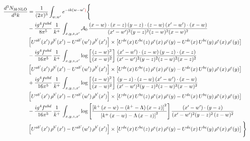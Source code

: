 \documentclass[9pt]{article}
\numberwithin{equation}{section}
\begin{document}
\begin{align}
\frac{d^{3}N_{3b\,\rm NLO}}{d^{3}k} & = \frac{1}{(2\pi)^{3}}\int_{w,w'}e^{-ik(w-w'{\color{red})}}\Bigg\{\notag \\
&-\frac{ig^{4}f^{abd}}{8\pi^{5}}\,\frac{1}{k^{+}}\,\int_{x,y,z,x'}\mathcal{A}_{0}\,
\frac{(x-w)\cdot(x-z)\,(y-z)\cdot(z-w)\,(x'-w')\cdot(x-w)}{(x'-w')^{2}(y-z)^{2}(z-w)^{2}(x-w)^{2}}\notag \\ & \left[U^{ab'}(x')\,\rho^{b'}(x')-U^{ab'}(w')\, \rho^{b'}(x')\right]\times \left[U^{de}(x)\,U^{bc}(z)\, \rho^{e}(x)\,\rho^{c}(y)-U^{de}(x)\,U^{bc}(y)\,\rho^{e}(x)\,\rho^{c}(y)\right] \notag \\
& -\frac{ig^{4}f^{abd}}{16\pi^{5}}\,\frac{1}{k^{+}}\,\int_{x,y,z,x'}\log{\left[\frac{(z-w)^{2}}{(x-w)^{2}}\right]}\,
\frac{(x'-w')\cdot(z-w)\,(y-z)\cdot(x-z)}{(x'-w')^{2}(y-z)^{2}(z-w)^{2}(x-z)^{2}}\notag \\
&\left[U^{ab'}(x')\,\rho^{b'}(x')-U^{ab'}(w')\, \rho^{b'}(x')\right]\times \left[U^{de}(x)\,U^{bc}(z)\, \rho^{e}(x)\,\rho^{c}(y)-U^{de}(x)\,U^{bc}(y)\,\rho^{e}(x)\,\rho^{c}(y)\right] \notag \\
&+ \frac{ig^{4}f^{abd}}{16\pi^{5}}\,\frac{1}{k^{+}}\,\int_{x,y,z,x'}\log{\left[\frac{(z-w)^{2}}{(x-w)^{2}}\right]}\,
\frac{(y-z)\cdot(z-w)\,(x'-w')\cdot(x-w)}{(x'-w')^{2}(y-z)^{2}(z-w)^{2}(x-w)^{2}}\notag \\ 
& \left[U^{ab'}(x')\,\rho^{b'}(x')-U^{ab'}(w')\, \rho^{b'}(x')\right]\times \left[U^{de}(x)\,U^{bc}(z)\, \rho^{e}(x)\,\rho^{c}(y)-U^{de}(x)\,U^{bc}(y)\,\rho^{e}(x)\,\rho^{c}(y)\right]\notag \\ &  -\frac{ig^{4}f^{abd}}{16\pi^{5}}\,\frac{1}{k^{+}}\,\int_{x,y,z,x'}\log{\left[\frac{\left[k^{+}\,(x-w)-(k^{+}-\Lambda)\,(x-z)\right]^{2}}{\left[k^{+}\,(x-w)-\Lambda\,(x-z)\right]^{2}}\right]}\,\frac{(x'-w')\cdot(y-z)}{(x'-w')^{2}(y-z)^{2}\,(z-w)^{2}}\notag \\ & \left[U^{ab'}(x')\,\rho^{b'}(x')-U^{ab'}(w')\, \rho^{b'}(x')\right]\times \left[U^{de}(x)\,U^{bc}(z)\, \rho^{e}(x)\,\rho^{c}(y)-U^{de}(x)\,U^{bc}(y)\,\rho^{e}(x)\,\rho^{c}(y)\right]\Bigg\}

\end{align}
\end{document}
